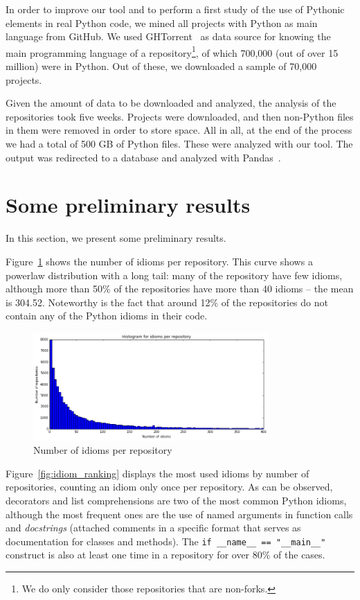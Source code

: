 \documentclass[a4paper]{article}
\begin{document}
In order to improve our tool and to perform a first study of the use of Pythonic elements in real Python code, we mined all projects with Python as main language from GitHub. We used GHTorrent~\cite{gousios2012ghtorrent} as data source for knowing the main programming language of a repository\footnote{We do only consider those repositories that are non-forks.}, of which 700,000 (out of over 15 million) were in Python. Out of these, we downloaded a sample of 70,000 projects.

Given the amount of data to be downloaded and analyzed, the analysis of the repositories took five weeks. Projects were downloaded, and then non-Python files in them were removed in order to store space. All in all, at the end of the process we had a total of 500 GB of Python files. These were analyzed with our tool. The output was redirected to a database and analyzed with Pandas~\cite{mckinney2012python}.

\section{Some preliminary results}

In this section, we present some preliminary results. 

Figure~\ref{fig:idioms_per_repository} shows the number of idioms per repository. This curve shows a powerlaw distribution with a long tail: many of the repository have few idioms, although more than 50\% of the repositories have more than 40 idioms -- the mean is 304.52. Noteworthy is the fact that around 12\% of the repositories do not contain any of the Python idioms in their code.

\begin{figure}[ht]
\centering  
\includegraphics[width=90mm]{img/idioms_per_repository.png}
\caption{Number of idioms per repository}
\label{fig:idioms_per_repository}
\end{figure}


Figure~\ref{fig:idiom_ranking} displays the most used idioms by number of repositories, counting an idiom only once per repository. As can be observed, decorators and list comprehensions are two of the most common Python idioms, although the most frequent ones are the use of named arguments in function calls and \emph{docstrings} (attached comments in a specific format that serves as documentation for classes and methods). The \verb|if __name__ == "__main__"| construct is also at least one time in a repository for over 80\% of the cases.
\end{document}
